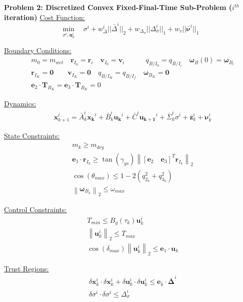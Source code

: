 \clearpage
\begin{mdframed}
\textbf{Problem 2: Discretized Convex Fixed-Final-Time Sub-Problem ($i^{th}$ iteration)}
\underline{Cost Function:}
\begin{equation*}
\min_{\sigma^i, \mathbf{u}_k^i} \quad \sigma^i + w_\Delta^i || \bar{\Delta}^i ||_2 + w_{\Delta_\sigma} || \Delta_\sigma^i ||_1 + w_v || \bar{\bm{\nu}}^i ||_1
\end{equation*}

\underline{Boundary Conditions:}  
\begin{align*}
& m_0 = m_{wet} \quad \mathbf{r}_{I_0} = \mathbf{r}_i \quad \mathbf{v}_{I_0} = \mathbf{v}_i \quad \quad \quad{q}_{B/I_0} = {q}_{B/I _{i}} \quad \bm{\omega}_B(0) = \bm{\omega}_{B _{i}} \\
& \mathbf{r}_{I_K} = \mathbf{0} \quad \quad \mathbf{v}_{I_K} = \mathbf{0} \quad {q}_{B/I _K} = {q}_{B/I _ {f}} \quad \bm{\omega}_{B_K} = \mathbf{0} \\
& \mathbf{e}_2 \cdot \mathbf{T}_{B_K}= \mathbf{e}_3 \cdot \mathbf{T}_{B_K}= 0
\end{align*}

\underline{Dynamics:}  
\begin{align*}
& \mathbf{x}_{k+1}^i = \bar{A}_k^i\mathbf{x_k}^i + \bar{B}_k^i\mathbf{u_k}^i + \bar{C}^i\mathbf{u_{k+1}}^i + \bar{\Sigma}_k^i\sigma^i + \bar{\mathbf{z}}^i_k + \bm{\nu}_k^i
\end{align*}

\underline{State Constraints:}  
\begin{align*}
& m_k \geq m_{dry} \\
& \mathbf{e}_1 \cdot \mathbf{r}_{I_k} \geq \tan(\gamma_{gs}) \left\lVert \left[\mathbf{e}_2 \quad \mathbf{e}_3\right]^T \mathbf{r}_{I_k} \right\lVert_2 \\
& \cos(\theta_{max}) \leq 1-2(q_{2_k}^{2}+q_{3_k}^{2}) \\
& \left \lVert \bm{\omega}_{B_k} \right \lVert_2 \leq \omega_{max}
\end{align*}

\underline{Control Constraints:}  
\begin{align*}
& T_{min} \leq B_g(\tau_k)\mathbf{u}_k^i \\
& \left \lVert \mathbf{u}_k^i \right \lVert_2 \leq T_{max} \\
& \cos(\delta_{max}) \left \lVert \mathbf{u}_k^i \right \lVert_2 \leq \bm{e}_1 \cdot \mathbf{u}_k
\end{align*}

\underline{Trust Regions:}  
\begin{align*}
& \delta \mathbf{x}_k^i \cdot \delta \mathbf{x}_k^i + \delta \mathbf{u}_k^i \cdot \delta \mathbf{u}_k^i \leq \mathbf{e}_k \cdot \bm{\bar{\Delta}}^i \\
& \delta \sigma^i \cdot \delta \sigma^i \leq \Delta_\sigma^i
\end{align*}

\end{mdframed}



